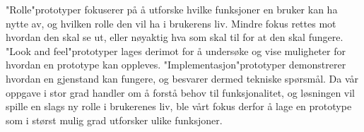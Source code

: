 \noindent
"Rolle"\-prototyper fokuserer på å utforske hvilke funksjoner en bruker kan ha nytte av, og hvilken rolle den vil ha i brukerens liv. Mindre fokus rettes mot hvordan den skal se ut, eller nøyaktig hva som skal til for at den skal fungere. "Look and feel"\-prototyper lages derimot for å undersøke og vise muligheter for hvordan en prototype kan oppleves. "Implementasjon"\-prototyper demonstrerer hvordan en gjenstand kan fungere, og besvarer dermed tekniske spørsmål. Da vår oppgave i stor grad handler om å forstå behov til funksjonalitet, og løsningen vil spille en slags ny rolle i brukerenes liv, ble vårt fokus derfor å lage en prototype som i størst mulig grad utforsker ulike funksjoner.


